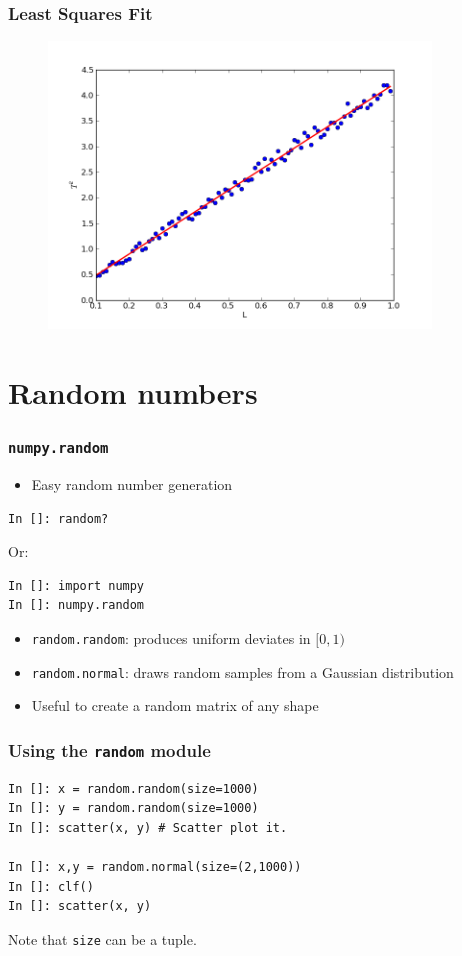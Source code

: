 \documentclass[14pt,compress]{beamer}
\newcounter{time}
\newcommand{\inctime}[1]{\addtocounter{time}{#1}{\tiny \thetime\ m}}
\newcommand{\typ}[1]{\lstinline{#1}}
\begin{document}
\begin{frame}[fragile]
\frametitle{Least Squares Fit}
\vspace{-0.15in}
\begin{figure}
\includegraphics[width=4in]{data/least-sq-fit}
\end{figure}
\inctime{10}
\end{frame}

\section{Random numbers}

\begin{frame}[fragile]
    \frametitle{\typ{numpy.random}}
    \begin{itemize}
        \item Easy random number generation
    \end{itemize}
    \begin{lstlisting}
In []: random?
    \end{lstlisting}
    Or:
    \begin{lstlisting}
In []: import numpy
In []: numpy.random
    \end{lstlisting}
\begin{itemize}
    \item \typ{random.random}: produces uniform deviates in $[0, 1)$
    \item \typ{random.normal}: draws random samples from a Gaussian
        distribution
    \item Useful to create a random matrix of any shape
\end{itemize}
\end{frame}

\begin{frame}[fragile]
    \frametitle{Using the \typ{random} module}
\begin{lstlisting}
In []: x = random.random(size=1000)
In []: y = random.random(size=1000)
In []: scatter(x, y) # Scatter plot it.

In []: x,y = random.normal(size=(2,1000))
In []: clf()
In []: scatter(x, y)
\end{lstlisting}
Note that \typ{size} can be a tuple.

\end{frame}
\end{document}
